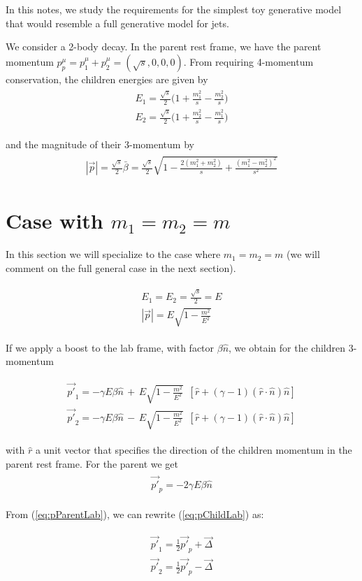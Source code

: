\documentclass[12pt]{article}
\newcommand{\bea}{\begin{eqnarray}\begin{aligned}}
\newcommand{\eea}{\end{aligned}\end{eqnarray}}
\begin{document}
In this notes, we study the requirements for the simplest toy generative model that would resemble a full generative model for jets.



We consider a 2-body decay. In the parent rest frame, we have the parent momentum $p^\mu_p=p^\mu_1+p^\mu_2=(\sqrt{s}, 0, 0, 0)$. From requiring 4-momentum conservation, the children energies are given by
\bea
E_1=\frac{\sqrt{s}}{2}\bigg(1+\frac{m_1^2}{s}-\frac{m_2^2}{s} \bigg) \\
E_2=\frac{\sqrt{s}}{2}\bigg(1+\frac{m_2^2}{s}-\frac{m_1^2}{s} \bigg)
\eea

and the magnitude of their 3-momentum by
\bea
|\vec{p}| =\frac{\sqrt{s}}{2} \bar{\beta}=\frac{\sqrt{s}}{2} \sqrt{1-\frac{2 (m_1^2+m_2^2)}{s}+\frac{(m_1^2-m_2^2)^2}{s^2}}
\eea



\section{Case with $m_1=m_2=m$}
In this section we will specialize to the case where $m_1=m_2=m$ (we will comment on the full general case in the next section).


\bea
E_1=E_2=\frac{\sqrt{s}}{2} = E \\
|\vec{p}| =E \sqrt{1-\frac{m^2}{E^2}}
\eea

If we  apply a boost to the lab frame, with factor $\beta \hat{n}$, we obtain for the children 3-momentum


\bea\label{eq:pChildLab}
\vec{p'}_1= - \gamma E \beta \hat{n} \,+\,  E \sqrt{1-\frac{m^2}{E^2}} \,\,\,[ \hat{r} + (\gamma -1) (\hat{r} \cdot \hat{n}) \hat{n} ] \\
\vec{p'}_2= - \gamma E \beta \hat{n} \,-\,  E \sqrt{1-\frac{m^2}{E^2}} \,\,\,[ \hat{r} + (\gamma -1) (\hat{r} \cdot \hat{n}) \hat{n} ]
\eea

with $\hat{r}$ a unit vector that specifies the direction of the children momentum in the parent rest frame. For the parent we get 
\bea\label{eq:pParentLab}
\vec{p'}_p= - 2 \gamma E \beta \hat{n} 
\eea

From (\ref{eq:pParentLab}), we can rewrite (\ref{eq:pChildLab}) as:

\bea\label{eq:pChildLab2}
\vec{p'}_1= \frac{1}{2} \vec{p'}_p + \vec{\Delta}  \\
\vec{p'}_2= \frac{1}{2} \vec{p'}_p - \vec{\Delta}
\eea
\end{document}

